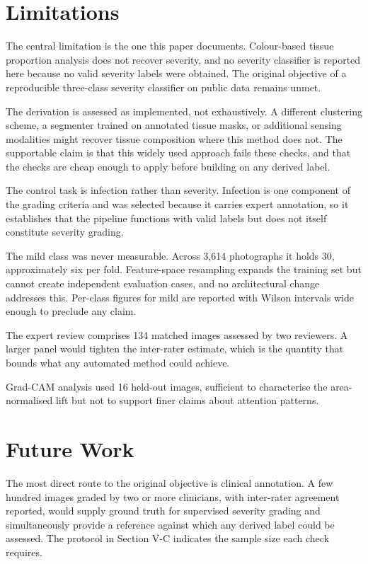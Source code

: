 \section{Limitations}

The central limitation is the one this paper documents. Colour-based tissue
proportion analysis does not recover severity, and no severity classifier is
reported here because no valid severity labels were obtained. The original
objective of a reproducible three-class severity classifier on public data
remains unmet.

The derivation is assessed as implemented, not exhaustively. A different
clustering scheme, a segmenter trained on annotated tissue masks, or
additional sensing modalities might recover tissue composition where this
method does not. The supportable claim is that this widely used approach
fails these checks, and that the checks are cheap enough to apply before
building on any derived label.

The control task is infection rather than severity. Infection is one
component of the grading criteria and was selected because it carries
expert annotation, so it establishes that the pipeline functions with valid
labels but does not itself constitute severity grading.

The mild class was never measurable. Across 3{,}614 photographs it holds
30, approximately six per fold. Feature-space resampling expands the
training set but cannot create independent evaluation cases, and no
architectural change addresses this. Per-class figures for mild are
reported with Wilson intervals wide enough to preclude any claim.

The expert review comprises 134 matched images assessed by two reviewers.
A larger panel would tighten the inter-rater estimate, which is the
quantity that bounds what any automated method could achieve.

Grad-CAM analysis used 16 held-out images, sufficient to characterise the
area-normalised lift but not to support finer claims about attention
patterns.

\section{Future Work}

The most direct route to the original objective is clinical annotation. A
few hundred images graded by two or more clinicians, with inter-rater
agreement reported, would supply ground truth for supervised severity
grading and simultaneously provide a reference against which any derived
label could be assessed. The protocol in Section V-C indicates the sample
size each check requires.

